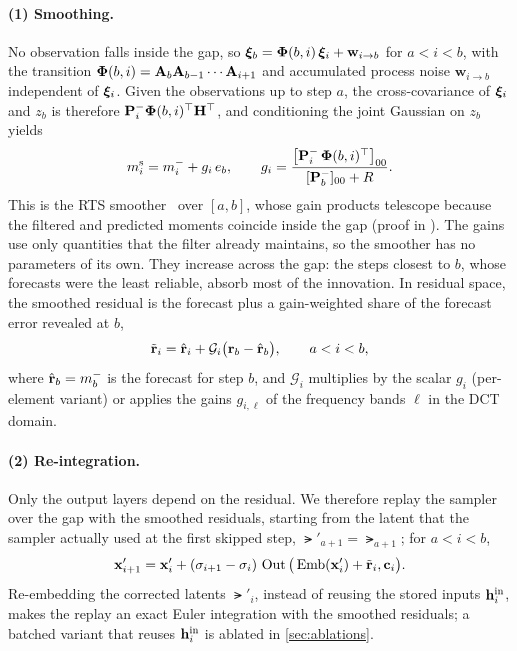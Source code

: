 \paragraph{(1) Smoothing.}
No observation falls inside the gap, so $\bm{\xi}_b=\bm{\Phi}(b,i)\,\bm{\xi}_i+\mathbf w_{i\to b}$ for $a<i<b$, with the
transition $\bm{\Phi}(b,i)=\mathbf{A}_b\mathbf{A}_{b-1}\cdots\mathbf{A}_{i+1}$ and accumulated process noise $\mathbf w_{i\to b}$ independent
of $\bm{\xi}_i$. Given the observations up to step $a$, the cross-covariance of $\bm{\xi}_i$ and $z_b$ is therefore
$\mathbf{P}^{-}_i\bm{\Phi}(b,i)^\top\mathbf H^\top$, and conditioning the joint Gaussian on $z_b$ yields
\begin{equation}
  m^{\mathrm{s}}_i=m^{-}_i+g_i\,e_b,\qquad
  g_i=\frac{\big[\mathbf{P}^{-}_i\,\bm{\Phi}(b,i)^\top\big]_{00}}{[\mathbf{P}^{-}_b]_{00}+R}.
  \label{eq:smooth}
\end{equation}
This is the RTS smoother~\cite{rauch1965maximum} over $[a,b]$, whose gain products telescope because the filtered and
predicted moments coincide inside the gap (proof in ). The gains use only quantities that the
filter already maintains, so the smoother has no parameters of its own. They increase across the gap: the steps
closest to $b$, whose forecasts were the least reliable, absorb most of the innovation. In residual space, the smoothed
residual is the forecast plus a gain-weighted share of the forecast error revealed at $b$,
\begin{equation}
  \tilde{\mathbf{r}}_i=\hat{\mathbf{r}}_i+\mathcal G_i\big(\mathbf{r}_b-\hat{\mathbf{r}}_b\big),\qquad a<i<b,
  \label{eq:smooth-res}
\end{equation}
where $\hat{\mathbf{r}}_b=m^{-}_b$ is the forecast for step $b$, and $\mathcal G_i$ multiplies by the scalar $g_i$
(per-element variant) or applies the gains $g_{i,\ell}$ of the frequency bands $\ell$ in the DCT domain.

\paragraph{(2) Re-integration.}
Only the output layers depend on the residual. We therefore replay the sampler over the gap with the smoothed
residuals, starting from the latent that the sampler actually used at the first skipped step, $\lat'_{a+1}=\lat_{a+1}$;
for $a<i<b$,
\begin{equation}
  \mathbf{x}'_{i+1}=\mathbf{x}'_i+(\sigma_{i+1}-\sigma_i)\,\operatorname{Out}\big(\operatorname{Emb}(\mathbf{x}'_i)+\tilde{\mathbf{r}}_i,\mathbf{c}_i\big).
  \label{eq:reint}
\end{equation}
Re-embedding the corrected latents $\lat'_i$, instead of reusing the stored inputs $\mathbf{h}^{\mathrm{in}}_i$, makes the replay an exact
Euler integration with the smoothed residuals; a batched variant that reuses $\mathbf{h}^{\mathrm{in}}_i$ is ablated in
\cref{sec:ablations}.

